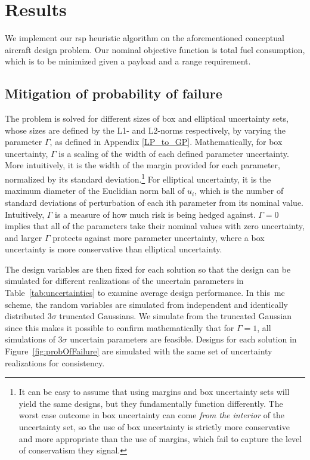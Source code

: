 \section{Results}

We implement our \gls{rsp} heuristic algorithm on the aforementioned conceptual aircraft design problem.
Our nominal objective function is total fuel consumption, which is
to be minimized given a payload and a range requirement.

\subsection{Mitigation of probability of failure}

The problem is solved for different sizes of box and elliptical uncertainty sets,
whose sizes are defined by the L1- and L2-norms respectively,
by varying the parameter $\Gamma$, as defined in Appendix \ref{LP_to_GP}. Mathematically, for box uncertainty,
$\Gamma$ is a scaling of the width of each defined parameter uncertainty. More intuitively,
it is the width of the margin provided for each parameter, normalized by its standard deviation.\footnote{It
can be easy to assume that using margins and box uncertainty sets will yield the same designs,
but they fundamentally function
differently. The worst case outcome in box uncertainty can come \emph{from the interior} of the uncertainty
set, so the use of box uncertainty is strictly more conservative and more appropriate than the use of margins,
which fail to capture the level of conservatism they signal.}
For elliptical uncertainty, it is the maximum diameter of the Euclidian norm
ball of $u_i$, which is the number of standard deviations of perturbation of each ith parameter from its nominal value.
Intuitively, $\Gamma$ is a measure of how much risk is being hedged against. $\Gamma = 0$
implies that all of the parameters take their nominal values with zero uncertainty,
and larger $\Gamma$ protects against more parameter uncertainty, where a box uncertainty is
more conservative than elliptical uncertainty.

The design variables are then fixed for each solution so that the design can be simulated for
different realizations of the uncertain parameters in Table~\ref{tab:uncertainties}
to examine average design performance. In this~\gls{mc} scheme, the random variables
are simulated from independent and identically distributed $3\sigma$ truncated Gaussians.
We simulate from the truncated Gaussian since this makes it possible to
confirm mathematically that for $\Gamma = 1$, all simulations of $3\sigma$ uncertain parameters are feasible.
Designs for each solution in Figure~\ref{fig:probOfFailure} are simulated with the same set
of uncertainty realizations for consistency. \\

